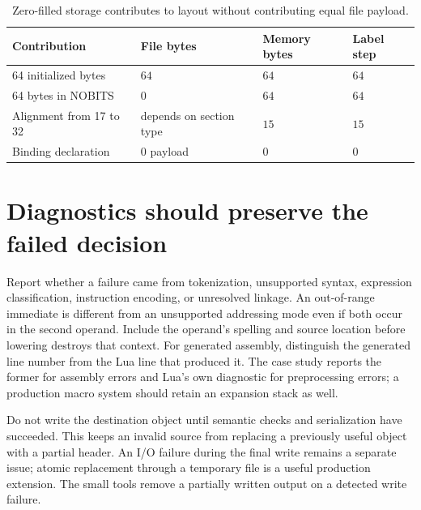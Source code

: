 \begin{table}[htbp]
\caption{Zero-filled storage contributes to layout without contributing equal file payload.}
\label{tab:ch53-storage}
\centering
\begin{tabular}{llll}
\toprule
Contribution & File bytes & Memory bytes & Label step \\
\midrule
64 initialized bytes & $64$ & $64$ & $64$ \\
64 bytes in NOBITS & $0$ & $64$ & $64$ \\
Alignment from 17 to 32 & depends on section type & $15$ & $15$ \\
Binding declaration & $0$ payload & $0$ & $0$ \\
\bottomrule
\end{tabular}
\end{table}

\section{Diagnostics should preserve the failed decision}
\label{sec:ch53-diagnostics}

Report whether a failure came from tokenization, unsupported syntax, expression classification, instruction encoding, or unresolved linkage.
An out-of-range immediate is different from an unsupported addressing mode even if both occur in the second operand.
Include the operand's spelling and source location before lowering destroys that context.
For generated assembly, distinguish the generated line number from the Lua line that produced it.
The case study reports the former for assembly errors and Lua's own diagnostic for preprocessing errors; a production macro system should retain an expansion stack as well.

Do not write the destination object until semantic checks and serialization have succeeded.
This keeps an invalid source from replacing a previously useful object with a partial header.
An I/O failure during the final write remains a separate issue; atomic replacement through a temporary file is a useful production extension.
The small tools remove a partially written output on a detected write failure.

